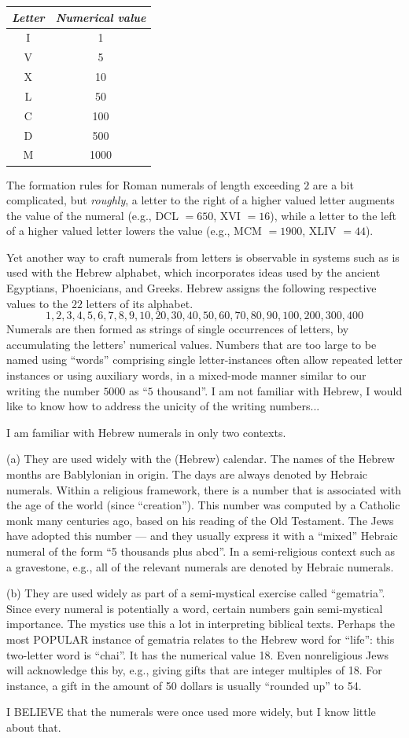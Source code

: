 \begin{tabular}{c|c}
{\it Letter} & {\it Numerical value} \\
\hline
I  & 1 \\
V  & 5 \\
X  & 10 \\
L  & 50 \\
C  & 100 \\
D  & 500 \\
M  & 1000
\end{tabular}

\noindent
The formation rules for Roman numerals of length exceeding $2$ are a
bit complicated, but {\em roughly}, a letter to the right of a higher
valued letter augments the value of the numeral (e.g., DCL $=650$, XVI
$=16$), while a letter to the left of a higher valued letter lowers
the value (e.g., MCM $=1900$, XLIV $=44$).

Yet another way to craft numerals from letters is observable in
systems such as is used with the Hebrew alphabet, which incorporates
ideas used by the ancient Egyptians, Phoenicians, and Greeks.  Hebrew
assigns the following respective values to the $22$ letters of its
alphabet.
\[ 1, 2, 3, 4, 5, 6, 7, 8, 9, 10,
20, 30, 40, 50, 60, 70, 80, 90, 100,
 200, 300, 400
\]
Numerals are then formed as strings of single occurrences of letters,
by accumulating the letters' numerical values.  Numbers that are too
large to be named using ``words'' comprising single letter-instances
often allow repeated letter instances or using auxiliary words, in a
mixed-mode manner similar to our writing the number $5000$ as ``$5$
thousand''.
{\Denis I am not familiar with Hebrew, I would like to know how to
  address the unicity of the writing numbers...}
{\Arny I am familiar with Hebrew numerals in only two contexts.

(a) They are used widely with the (Hebrew) calendar.  The names of the
  Hebrew months are Bablylonian in origin.  The days are always
  denoted by Hebraic numerals.  Within a religious framework, there is
  a number that is associated with the age of the world (since
  ``creation'').  This number was computed by a Catholic monk many
  centuries ago, based on his reading of the Old Testament.  The Jews
  have adopted this number --- and they usually express it with a
  ``mixed'' Hebraic numeral of the form ``5 thousands plus abcd''.  In
  a semi-religious context such as a gravestone, e.g., all of the
  relevant numerals are denoted by Hebraic numerals.

(b) They are used widely as part of a semi-mystical exercise called
  ``gematria''.  Since every numeral is potentially a word, certain
  numbers gain semi-mystical importance.  The mystics use this a lot
  in interpreting biblical texts.  Perhaps the most POPULAR instance
  of gematria relates to the Hebrew word for ``life'': this two-letter
  word is ``chai''.  It has the numerical value 18.  Even nonreligious
  Jews will acknowledge this by, e.g., giving gifts that are integer
  multiples of 18.  For instance, a gift in the amount of 50 dollars is
  usually ``rounded up'' to 54.

I BELIEVE that the numerals were once used more widely, but I know
little about that.}

